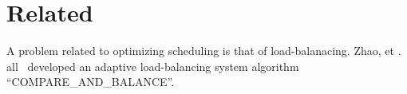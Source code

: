 \section{Related}

A problem related to optimizing scheduling is that of load-balanacing.  Zhao, et
. all~\cite{Zhao} developed an adaptive load-balancing system algorithm
``COMPARE\_AND\_BALANCE''.
